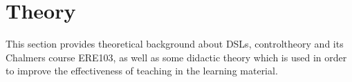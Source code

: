 \section{Theory}\label{sec:theory}

\begin{newtext}
This section provides theoretical background about \gls{DSL}s, \gls{controltheory} and its Chalmers course \gls{ERE103}, as well as some didactic theory which is used in order to improve the effectiveness of teaching in the learning material. 
\end{newtext}

\iffalse
The theory needed for the product of this project consists of four parts. 

First some basic information on \gls{ERE103}; Chalmers' course on \gls{controltheory}.  

Second a rundown on \gls{DSL}s; the main tool with which the project was created.

Third is a section on \gls{controltheory} itself; the main subject of the project.

Finally, there is a section on \gls{didactic}s; providing some valuable insight into how to design effective teaching material.
\fi 
 






